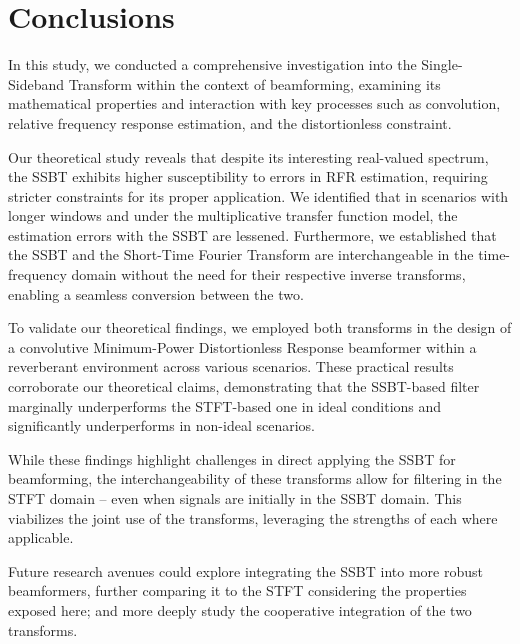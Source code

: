 \section{Conclusions}
\label{sec:conclusion}

In this study, we conducted a comprehensive investigation into the Single-Sideband Transform within the context of beamforming, examining its mathematical properties and interaction with key processes such as convolution, relative frequency response estimation, and the distortionless constraint.

Our theoretical study reveals that despite its interesting real-valued spectrum, the SSBT exhibits higher susceptibility to errors in RFR estimation, requiring stricter constraints for its proper application. We identified that in scenarios with longer windows and under the multiplicative transfer function model, the estimation errors with the SSBT are lessened. Furthermore, we established that the SSBT and the Short-Time Fourier Transform are interchangeable in the time-frequency domain without the need for their respective inverse transforms, enabling a seamless conversion between the two.

To validate our theoretical findings, we employed both transforms in the design of a convolutive Minimum-Power Distortionless Response beamformer within a reverberant environment across various scenarios. These practical results corroborate our theoretical claims, demonstrating that the SSBT-based filter marginally underperforms the STFT-based one in ideal conditions and significantly underperforms in non-ideal scenarios.

While these findings highlight challenges in direct applying the SSBT for beamforming, the interchangeability of these transforms allow for filtering in the STFT domain -- even when signals are initially in the SSBT domain. This viabilizes the joint use of the transforms, leveraging the strengths of each where applicable.

Future research avenues could explore integrating the SSBT into more robust beamformers, further comparing it to the STFT considering the properties exposed here; and more deeply study the cooperative integration of the two transforms.